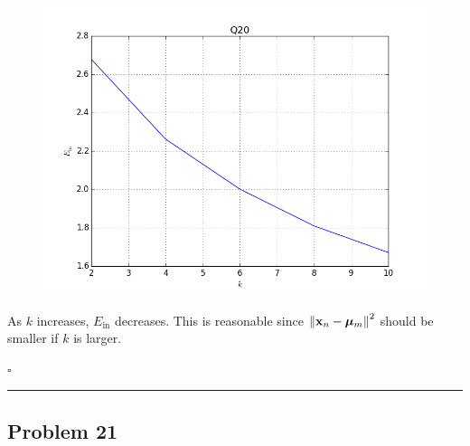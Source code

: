 \documentclass[12pt]{article}
\newcommand*{\QEDB}{\hfill\ensuremath{\square}}
\newcommand{\BF}[1]{{\bf#1}}
\newcommand{\VecAbsVal}[1]{\left\|#1\right\|}
\newcommand{\horrule}[1]{\rule{\linewidth}{#1}}
\begin{document}
\begin{figure}[H]
	\centering
	\includegraphics[scale=0.5]{Q20.png}
\end{figure}
As $k$ increases, $E_{\text{in}}$ decreases. This is reasonable since $\VecAbsVal{\BF{x}_n-\bm{\mu}_m}^2$ should be smaller if $k$ is larger.

\QEDB

\horrule{0.5pt}

\subsection*{Problem 21}
\end{document}
